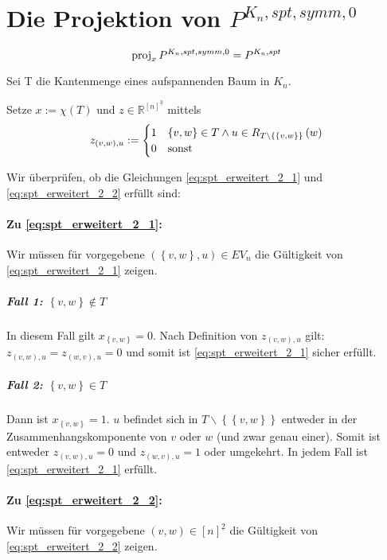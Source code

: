 \documentclass[10p,a4paper,BCOR = 12mm, DIV=15]{scrbook}
\begin{document}
\section{Die Projektion von $P^{K_n, spt, symm, 0}$}

\begin{Sa}\label{sa:proj_spt_erw}
\begin{displaymath}
\operatorname{proj}_x P^{K_n, spt, symm, 0} = P^{K_n, spt}
\end{displaymath}
\end{Sa}
\begin{bew}

Sei T die Kantenmenge eines aufspannenden Baum in $K_n$.

Setze $x:=\chi\left(T\right)$ und $z\in \mathbb{R}^{[n]^{\underline{3}}}$ mittels
\begin{displaymath}
z_{\left(v, w\right), u} := \begin{cases}
1 & \left\{v, w\right\}\in T\wedge u\in R_{T\backslash \left\{\left\{v, w\right\}\right\}}\left(w\right) \\
0 & \textnormal{sonst}
\end{cases}
\end{displaymath}

Wir überprüfen, ob die Gleichungen \eqref{eq:spt_erweitert_2_1} und \eqref{eq:spt_erweitert_2_2} erfüllt sind:

\paragraph{Zu \eqref{eq:spt_erweitert_2_1}:} Wir müssen für vorgegebene $\left(\left\{v, w\right\}, u\right) \in EV_n$ die Gültigkeit von \eqref{eq:spt_erweitert_2_1} zeigen.

\subparagraph{Fall 1: $\left\{v, w\right\}\notin T$} In diesem Fall gilt $x_{\left\{v, w\right\}}=0$. Nach Definition von $z_{(v, w), u}$ gilt: $z_{(v, w), u}=z_{(w, v), u}=0$ und somit ist \eqref{eq:spt_erweitert_2_1} sicher erfüllt.

\subparagraph{Fall 2: $\left\{v, w\right\}\in T$} Dann ist $x_{\left\{v, w\right\}} = 1$. $u$ befindet sich in $T\backslash \left\{\left\{v, w\right\}\right\}$ entweder in der Zusammenhangskomponente von $v$ oder $w$ (und zwar genau einer). Somit ist entweder $z_{(v, w), u}=0$ und $z_{(w, v), u}=1$ oder umgekehrt. In jedem Fall ist \eqref{eq:spt_erweitert_2_1} erfüllt.

\paragraph{Zu \eqref{eq:spt_erweitert_2_2}:} Wir müssen für vorgegebene $\left(v, w\right) \in \left[n\right]^{\underline{2}}$ die Gültigkeit von \eqref{eq:spt_erweitert_2_2} zeigen.


\end{bew}
\end{document}
